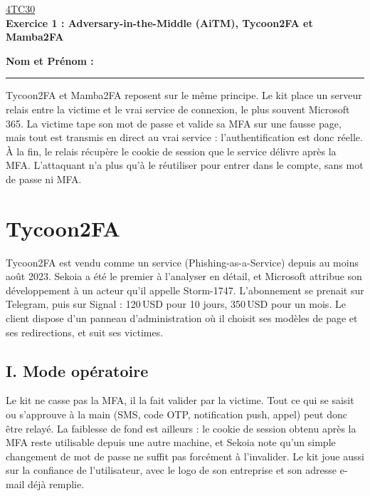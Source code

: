 \documentclass[10pt,a4paper]{article}
\begin{document}
\begin{center}
  \underline{4TC30}\\[2pt]
  {\large\bfseries Exercice 1 : Adversary-in-the-Middle (AiTM), Tycoon2FA et Mamba2FA}
\end{center}
\textbf{Nom et Prénom :} \rule{8cm}{0.4pt}

\medskip
Tycoon2FA et Mamba2FA reposent sur le même principe. Le kit place un serveur relais entre la victime et le vrai service de connexion, le plus souvent Microsoft 365. La victime tape son mot de passe et valide sa MFA sur une fausse page, mais tout est transmis en direct au vrai service : l'authentification est donc réelle. À la fin, le relais récupère le cookie de session que le service délivre après la MFA. L'attaquant n'a plus qu'à le réutiliser pour entrer dans le compte, sans mot de passe ni MFA.

\section{Tycoon2FA}
Tycoon2FA est vendu comme un service (Phishing-as-a-Service) depuis au moins août 2023. Sekoia a été le premier à l'analyser en détail, et Microsoft attribue son développement à un acteur qu'il appelle Storm-1747. L'abonnement se prenait sur Telegram, puis sur Signal : 120\,USD pour 10 jours, 350\,USD pour un mois. Le client dispose d'un panneau d'administration où il choisit ses modèles de page et ses redirections, et suit ses victimes.

\subsection{I. Mode opératoire}
Le kit ne casse pas la MFA, il la fait valider par la victime. Tout ce qui se saisit ou s'approuve à la main (SMS, code OTP, notification push, appel) peut donc être relayé. La faiblesse de fond est ailleurs : le cookie de session obtenu après la MFA reste utilisable depuis une autre machine, et Sekoia note qu'un simple changement de mot de passe ne suffit pas forcément à l'invalider. Le kit joue aussi sur la confiance de l'utilisateur, avec le logo de son entreprise et son adresse e-mail déjà remplie.
\end{document}
